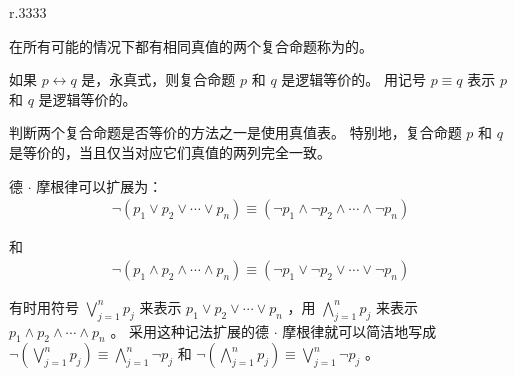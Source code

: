 {{\begin{wraptable}{r}{.3333\textwidth{}}
            \caption{德 $\cdot$ 摩根律}
        \end{wraptable}

        在所有可能的情况下都有相同真值的两个复合命题称为的。

        \begin{defines}
            如果 $p \leftrightarrow q$ 是，永真式，则复合命题 $p$ 和 $q$ 是逻辑等价的。
            用记号 $p \equiv q$ 表示 $p$ 和 $q$ 是逻辑等价的。
        \end{defines}

        判断两个复合命题是否等价的方法之一是使用真值表。
        特别地，复合命题 $p$ 和 $q$ 是等价的，当且仅当对应它们真值的两列完全一致。

        德 $\cdot$ 摩根律可以扩展为：
        \begin{align}
            \neg (p_1 \vee p_2 \vee \cdots \vee p_n) \equiv (\neg p_1 \wedge \neg p_2 \wedge \cdots \wedge \neg p_n)
        \end{align}

        和
        \begin{align}
            \neg (p_1 \wedge p_2 \wedge \cdots \wedge p_n) \equiv (\neg p_1 \vee \neg p_2 \vee \cdots \vee \neg p_n)
        \end{align}

        有时用符号 $\bigvee\limits_{j = 1}^n p_j$ 来表示 $p_1 \vee p_2 \vee \cdots \vee p_n$ ，用 $\bigwedge\limits_{j = 1}^n p_j$ 来表示 $p_1 \wedge p_2 \wedge \cdots \wedge p_n$ 。
        采用这种记法扩展的德 $\cdot$ 摩根律就可以简洁地写成 $\neg (\bigvee\limits_{j = 1}^n p_j) \equiv \bigwedge\limits_{j = 1}^n \neg p_j$ 和 $\neg (\bigwedge\limits_{j = 1}^n p_j) \equiv \bigvee\limits_{j = 1}^n \neg p_j$ 。

        \begin{minipage}[c]{\textwidth{}}
            \begin{minipage}[c]{.6\textwidth{}}
                \begin{table}[H]
                    \centering


\end{table}
\end{minipage}
\end{minipage}}}

